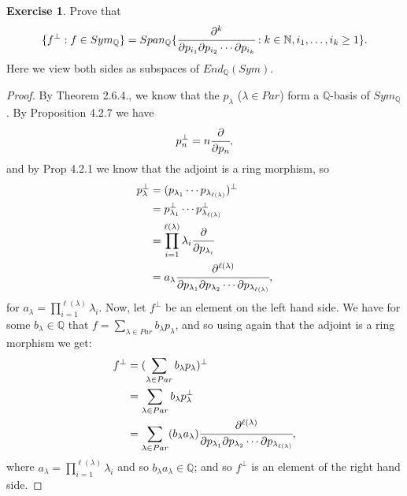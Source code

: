 \documentclass[8pt]{extarticle}
\newcommand{\set}[1]{\{#1\}}
\newcommand{\N}{\mathbb{N}}
\newcommand{\Q}{\mathbb{Q}}
\newcommand{\<}{\langle}
\renewcommand{\>}{\rangle}
\theoremstyle{definition}
\newtheorem{exercise}{Exercise}
\begin{document}
\begin{exercise}
  Prove that
  \begin{align*}
    \set{f^{\perp} : f \in Sym_\Q} = Span_{\Q}\set{\cfrac{\partial^k}{\partial p_{i_1} \partial p_{i_2} \cdots \partial p_{i_k}} : k \in \N, i_1, \dots, i_k \geq 1 }.
  \end{align*}
  Here we view both sides as subspaces of $End_{\Q}(Sym)$.
\end{exercise}

\begin{proof}
  By Theorem 2.6.4., we know that the $p_\lambda$ ($\lambda \in Par$) form a $\Q$-basis of $Sym_\Q$. By Proposition 4.2.7 we have
  \begin{align*}
    p_n^{\perp} = n \cfrac{\partial}{\partial p_n},
  \end{align*}
  and by Prop 4.2.1 we know that the adjoint is a ring morphism, so
  \begin{align*}
    p_{\lambda}^{\perp} &=
    (p_{\lambda_1} \cdots p_{\lambda_{\ell(\lambda)}})^{\perp} \\
    &= p_{\lambda_1}^{\perp} \cdots p_{\lambda_{\ell(\lambda)}}^{\perp} \\
    &= \prod_{i=1}^{\ell(\lambda)} \lambda_i \cfrac{\partial}{\partial p_{\lambda_i}} \\
    &= a_{\lambda} \cfrac{\partial^{\ell(\lambda)}}{\partial p_{\lambda_1}\partial p_{\lambda_2} \cdots \partial p_{\lambda_{\ell(\lambda)}}},
  \end{align*}
  for $a_{\lambda} = \prod\limits_{i=1}^{\ell(\lambda)} \lambda_i$. Now, let $f^{\perp}$ be an element on the left hand side. We have for some $b_\lambda \in \Q$ that $f = \sum\limits_{\lambda \in Par} b_{\lambda} p_{\lambda}$, and so using again that the adjoint is a ring morphism we get:
  \begin{align*}
    f^{\perp}
    &=
    (\sum\limits_{\lambda \in Par} b_{\lambda} p_{\lambda})^{\perp}
    \\
    &=
    \sum\limits_{\lambda \in Par} b_{\lambda} p_{\lambda}^{\perp}    \\
    &=
    \sum\limits_{\lambda \in Par} (b_{\lambda} a_{\lambda}) \cfrac{\partial^{\ell(\lambda)}}{\partial p_{\lambda_1}\partial p_{\lambda_2} \cdots \partial p_{\lambda_{\ell(\lambda)}}}, 
  \end{align*}
  where $a_{\lambda} = \prod\limits_{i=1}^{\ell(\lambda)} \lambda_i$ and so $b_{\lambda} a_{\lambda} \in \Q$; and so $f^{\perp}$ is an element of the right hand side.
  

\end{proof}
\end{document}
